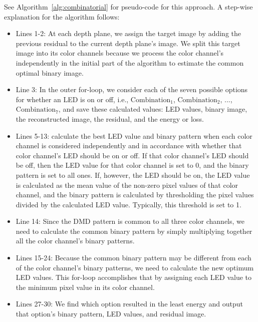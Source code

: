 
%
See Algorithm~\ref{alg:combinatorial} for pseudo-code for this approach. A step-wise explanation for the algorithm follows:
\begin{itemize}
    \item Lines 1-2: At each depth plane, we assign the target image by adding the previous residual to the current depth plane's image. We split this target image into its color channels because we process the color channel's independently in the initial part of the algorithm to estimate the common optimal binary image.
    \item Line 3: In the outer for-loop, we consider each of the seven possible options for whether an LED is on or off, i.e., $\text{Combination}_1$, $\text{Combination}_2$, ..., $\text{Combination}_7$, and save these calculated values: LED values, binary image, the reconstructed image, the residual, and the energy or loss.
    \item Lines 5-13: calculate the best LED value and binary pattern when each color channel is considered independently and in accordance with whether that color channel's LED should be on or off. If that color channel's LED should be off, then the LED value for that color channel is set to 0, and the binary pattern is set to all ones. If, however, the LED should be on, the LED value is calculated as the mean value of the non-zero pixel values of that color channel, and the binary pattern is calculated by thresholding the pixel values divided by the calculated LED value. Typically, this threshold is set to 1.
    \item Line 14: Since the DMD pattern is common to all three color channels, we need to calculate the common binary pattern by simply multiplying together all the color channel's binary patterns. 
    \item Lines 15-24: Because the common binary pattern may be different from each of the color channel's binary patterns, we need to calculate the new optimum LED values. This for-loop accomplishes that by assigning each LED value to the minimum pixel value in its color channel.
    \item Lines 27-30: We find which option resulted in the least energy and output that option's binary pattern, LED values, and residual image. 
\end{itemize}


